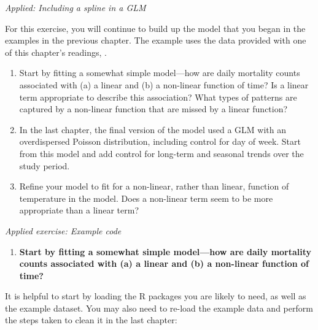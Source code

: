 \documentclass[
]{book}
\newenvironment{Shaded}{\begin{snugshade}}{\end{snugshade}}
\newcommand{\CommentTok}[1]{\textcolor[rgb]{0.56,0.35,0.01}{\textit{#1}}}
\newcommand{\DataTypeTok}[1]{\textcolor[rgb]{0.13,0.29,0.53}{#1}}
\newcommand{\KeywordTok}[1]{\textcolor[rgb]{0.13,0.29,0.53}{\textbf{#1}}}
\newcommand{\NormalTok}[1]{#1}
\newcommand{\OperatorTok}[1]{\textcolor[rgb]{0.81,0.36,0.00}{\textbf{#1}}}
\newcommand{\OtherTok}[1]{\textcolor[rgb]{0.56,0.35,0.01}{#1}}
\newcommand{\StringTok}[1]{\textcolor[rgb]{0.31,0.60,0.02}{#1}}
\providecommand{\tightlist}{%
  \setlength{\itemsep}{0pt}\setlength{\parskip}{0pt}}
\begin{document}
\emph{Applied: Including a spline in a GLM}

For this exercise, you will continue to build up the model that you began in
the examples in the previous chapter. The example uses the data provided with
one of this chapter's readings, \citet{vicedo2019hands}.

\begin{enumerate}
\def\labelenumi{\arabic{enumi}.}
\tightlist
\item
  Start by fitting a somewhat simple model---how are daily mortality counts
  associated with (a) a linear and (b) a non-linear function of time? Is a linear
  term appropriate to describe this association? What types of patterns are
  captured by a non-linear function that are missed by a linear function?
\item
  In the last chapter, the final version of the model used a GLM with an
  overdispersed Poisson distribution, including control for day of week.
  Start from this model and add control for long-term and seasonal trends
  over the study period.
\item
  Refine your model to fit for a non-linear, rather than linear, function
  of temperature in the model. Does a non-linear term seem to be more
  appropriate than a linear term?
\end{enumerate}

\emph{Applied exercise: Example code}

\begin{enumerate}
\def\labelenumi{\arabic{enumi}.}
\tightlist
\item
  \textbf{Start by fitting a somewhat simple model---how are daily mortality counts
  associated with (a) a linear and (b) a non-linear function of time?}
\end{enumerate}

It is helpful to start by loading the R packages you are likely to need, as
well as the example dataset. You may also need to re-load the example data
and perform the steps taken to clean it in the last chapter:

\begin{Shaded}
\end{Shaded}
\end{document}
